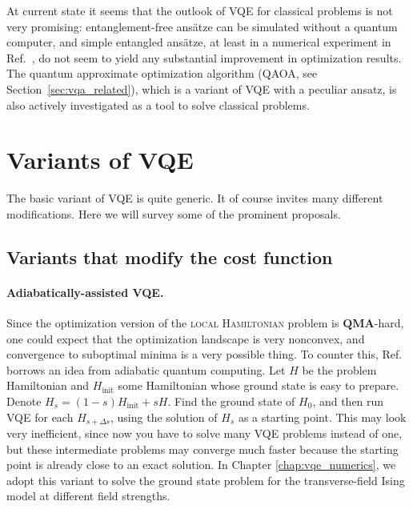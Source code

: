 At current state it seems that the outlook of VQE for classical problems is not very promising: entanglement-free ans\"atze can be simulated without a quantum computer, and simple entangled ans\"atze, at least in a numerical experiment in Ref.~\cite{nannicini_performance_2019}, do not seem to yield any substantial improvement in optimization results. The quantum approximate optimization algorithm (QAOA, see Section~\ref{sec:vqa_related}), which is a variant of VQE with a peculiar ansatz, is also actively investigated as a tool to solve classical problems.

\section{Variants of VQE}
\label{sec:vqe_variants}

The basic variant of VQE is quite generic. It of course invites many different modifications. Here we will survey some of the prominent proposals.

\subsection{Variants that modify the cost function}

\paragraph{Adiabatically-assisted VQE.} Since the optimization version of the \textsc{local Hamiltonian} problem is $\mathbf{QMA}$-hard, one could expect that the optimization landscape is very nonconvex, and convergence to suboptimal minima is a very possible thing. To counter this, Ref.~\cite{garcia-saez_addressing_2018} borrows an idea from adiabatic quantum computing. Let $H$ be the problem Hamiltonian and $H_{\text{init}}$ some Hamiltonian whose ground state is easy to prepare. Denote $H_s = (1-s)H_{\text{init}} + sH$. Find the ground state of $H_0$, and then run VQE for each $H_{s + \Delta s}$, using the solution of $H_{s}$ as a starting point. This may look very inefficient, since now you have to solve many VQE problems instead of one, but these intermediate problems may converge much faster because the starting point is already close to an exact solution. In Chapter \ref{chap:vqe_numerics}, we adopt this variant to solve the ground state problem for the transverse-field Ising model at different field strengths.

